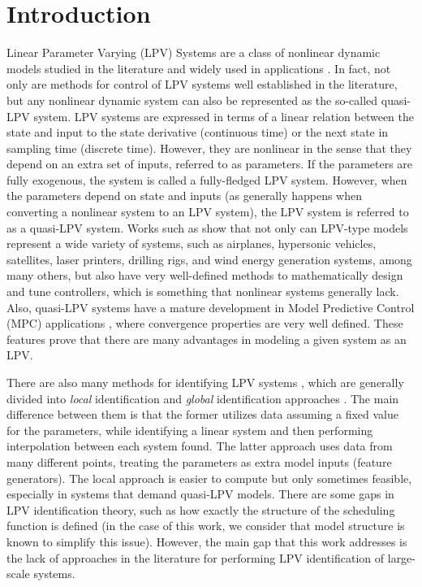
\section{Introduction}

Linear Parameter Varying (LPV) Systems are a class of nonlinear dynamic models studied in the literature and widely used in applications  \cite{Hoffman2014}. 
%
In fact, not only are methods for control of LPV systems well established in the literature, but any nonlinear dynamic system can also be represented as the so-called quasi-LPV system.
%
LPV systems are expressed in terms of a linear relation between the state and input to the state derivative (continuous time) or the next state in sampling time (discrete time).
%
However, they are nonlinear in the sense that they depend on an extra set of inputs, referred to as parameters.
%
If the parameters are fully exogenous, the system is called a fully-fledged LPV system. 
%
However, when the parameters depend on state and inputs (as generally happens when converting a nonlinear system to an LPV system), the LPV system is referred to as a quasi-LPV system.
%
Works such as \cite{Hoffman2014} show that not only can LPV-type models represent a wide variety of systems, such as airplanes, hypersonic vehicles, satellites, laser printers, drilling rigs, and wind energy generation systems, among many others, but also have very well-defined methods to mathematically design and tune controllers, which is something that nonlinear systems generally lack.
%
Also, quasi-LPV systems have a mature development in Model Predictive Control (MPC) applications \cite{Morato2024}, where convergence properties are very well defined.
%
These features prove that there are many advantages in modeling a given system as an LPV.


There are also many methods for identifying LPV systems \cite{LopesdosSantos2011}, which are generally divided into \textit{local} identification \cite{Zhang2017232} and \textit{global} identification approaches \cite{Armanini2018}.
%
The main difference between them is that the former utilizes data assuming a fixed value for the parameters, while identifying a linear system and then performing interpolation between each system found.
%
The latter approach uses data from many different points, treating the parameters as extra model inputs (feature generators). The local approach is easier to compute but only sometimes feasible, especially in systems that demand quasi-LPV models.
%
There are some gaps in LPV identification theory, such as how exactly the structure of the scheduling function is defined \cite{LopesdosSantos2011} (in the case of this work, we consider that model structure is known to simplify this issue).
%
However, the main gap that this work addresses is the lack of approaches in the literature for performing LPV identification of large-scale systems.



